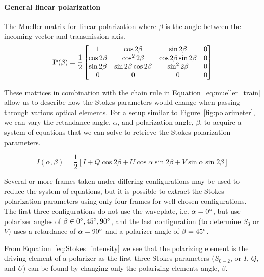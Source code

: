 \paragraph*{General linear polarization}
The Mueller matrix for linear polarization where $\beta$ is the angle between the incoming vector and transmission axis.
\begin{equation}
    \mathbf{P}(\beta) = \frac{1}{2}
    \begin{bmatrix}
        1            & \cos 2 \beta              & \sin 2 \beta              & 0 \\
        \cos 2 \beta & \cos^{2} 2 \beta          & \cos 2 \beta \sin 2 \beta & 0 \\
        \sin 2 \beta & \sin 2 \beta \cos 2 \beta & \sin^{2} 2 \beta          & 0 \\
        0            & 0                         & 0                         & 0 \\
    \end{bmatrix}
    \label{matrix:polarizer}
\end{equation}
\prgph

These matrices in combination with the chain rule in Equation~\ref{eq:mueller_train} allow us to describe how the Stokes parameters would change when passing through various optical elements. For a setup similar to Figure~\ref{fig:polarimeter}, we can vary the retandance angle, $\alpha$, and polarization angle, $\beta$, to acquire a system of equations that we can solve to retrieve the Stokes polarization parameters.

\begin{equation}
    I(\alpha, \beta) = \frac{1}{2} \left[ I + Q \cos2\beta + U \cos\alpha \sin2\beta + V \sin\alpha \sin2\beta\right]
    \label{eq:Stokes_intensity}
\end{equation}

Several or more frames taken under differing configurations may be used to reduce the system of equations, but it is possible to extract the Stokes polarization parameters using only four frames for well-chosen configurations. The first three configurations do not use the waveplate, i.e. $\alpha = 0\hbox{$^\circ$}$, but use polarizer angles of $\beta \in {0\hbox{$^\circ$}, 45\hbox{$^\circ$}, 90\hbox{$^\circ$}}$, and the last configuration (to determine $S_{3}$ or $V$) uses a retardance of $\alpha = 90\hbox{$^\circ$}$ and a polarizer angle of $\beta = 45\hbox{$^\circ$}$.
\prgph

From Equation~\ref{eq:Stokes_intensity} we see that the polarizing element is the driving element of a polarizer as the first three Stokes parameters ($S_{0-2}$, or $I$, $Q$, and $U$) can be found by changing only the polarizing elements angle, $\beta$.

